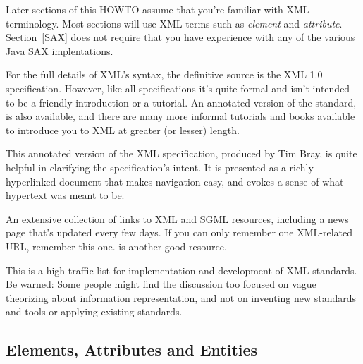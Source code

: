 \documentclass{howto}
\begin{document}
Later sections of this HOWTO assume that you're familiar with XML
terminology.  Most sections will use XML terms such as \emph{element}
and \emph{attribute}.  Section~\ref{SAX} does not require that you
have experience with any of the various Java SAX implentations.


\begin{seealso}
           {For the full details of XML's syntax, the definitive
            source is the XML 1.0 specification.  However, like all
            specifications it's quite formal and isn't intended to be
            a friendly introduction or a tutorial.  An annotated
            version of the standard, is also available, and there are
            many more informal tutorials and books available to
            introduce you to XML at greater (or lesser) length.}

           {This annotated version of the XML specification, produced
            by Tim Bray, is quite helpful in clarifying the
            specification's intent.  It is presented as a
            richly-hyperlinked document that makes navigation easy,
            and evokes a sense of what hypertext was meant to be.}

           {An extensive collection of links to XML and SGML
            resources, including a news page that's updated every few
            days.  If you can only remember one XML-related URL,
            remember this one.
            is another good resource.}

           {This is a high-traffic list for implementation and
            development of XML standards.  Be warned: Some people
            might find the discussion too focused on vague theorizing
            about information representation, and not on inventing new
            standards and tools or applying existing standards.}
\end{seealso}


\subsection{Elements, Attributes and Entities}
\end{document}

